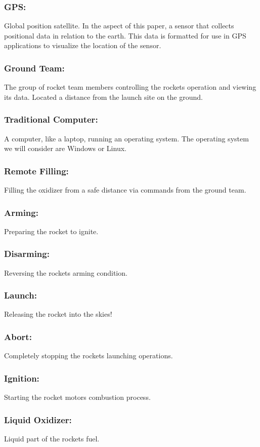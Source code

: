 \documentclass[10pt,draftclsnofoot,onecolumn,retainorgcmds]{IEEEtran}
\begin{document}
\subsubsection{\bf GPS:} Global position satellite. In the aspect of this paper, a sensor that collects positional data in relation to the earth. This data is formatted for use in GPS applications to visualize the location of the sensor.
\subsubsection{\bf Ground Team:} The group of rocket team members controlling the rockets operation and viewing its data. Located a distance from the launch site on the ground.
\subsubsection{\bf Traditional Computer:}A computer, like a laptop, running an operating system. The operating system we will consider are Windows or Linux.
\subsubsection{\bf Remote Filling:} Filling the oxidizer from a safe distance via commands from the ground team.
\subsubsection{\bf Arming:} Preparing the rocket to ignite.
\subsubsection{\bf Disarming:} Reversing the rockets arming condition. 
\subsubsection{\bf Launch:} Releasing the rocket into the skies! 
\subsubsection{\bf Abort:} Completely stopping the rockets launching operations.
\subsubsection{\bf Ignition:} Starting the rocket motors combustion process.
\subsubsection{\bf Liquid Oxidizer:}Liquid part of the rockets fuel. 
\end{document}
